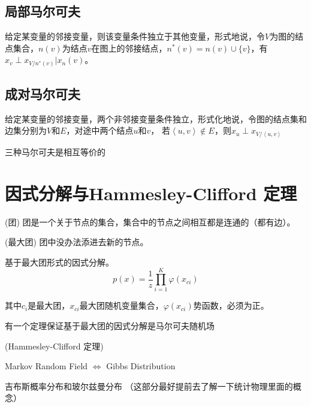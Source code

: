 \subsection*{局部马尔可夫}

给定某变量的邻接变量，则该变量条件独立于其他变量，形式地说，令$V$为图的结点集合，$n(v)$为结点$v$在图上的邻接结点，$n^*(v)=n(v)\cup\{v\}$，有
$x_v\perp x_{V/n^*(v)}|x_n(v)$。

\subsection*{成对马尔可夫}

给定某变量的邻接变量，两个非邻接变量条件独立，形式化地说，令图的结点集和边集分别为$V$和$E$，对途中两个结点$u$和$v$，
若$\left\langle u,v\right\rangle \notin E$，则$x_u\perp x_{V/\left\langle u,v\right\rangle}$

\begin{proposition}
    三种马尔可夫是相互等价的
\end{proposition}

\section{因式分解与Hammesley-Clifford 定理}

\begin{define}
    (团) 团是一个关于节点的集合，集合中的节点之间相互都是连通的（都有边）。
\end{define}

\begin{define}
    (最大团) 团中没办法添进去新的节点。
\end{define}

基于最大团形式的因式分解。
\begin{equation}
    p(x)=\frac{1}{z}\prod\limits_{i=1}^{K}\varphi(x_{ci})
\end{equation}

其中$c_i$是最大团，$x_{ci}$最大团随机变量集合，$\varphi(x_{ci})$势函数，必须为正。

有一个定理保证基于最大团的因式分解是马尔可夫随机场

\begin{theorem}
    (Hammesley-Clifford 定理)
\end{theorem}

Markov Random Field $\Leftrightarrow$ Gibbs Distribution

吉布斯概率分布和玻尔兹曼分布
（这部分最好提前去了解一下统计物理里面的概念）

